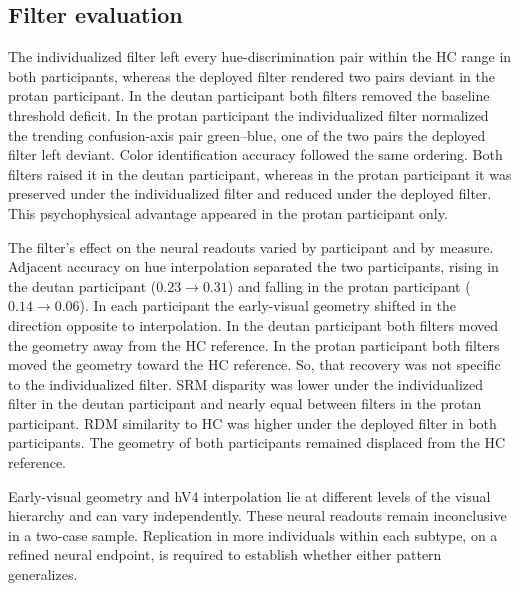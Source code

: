 \subsection{Filter evaluation}
The individualized filter left every hue-discrimination pair within the HC range in both participants, whereas the deployed filter rendered two pairs deviant in the protan participant. In the deutan participant both filters removed the baseline threshold deficit. In the protan participant the individualized filter normalized the trending confusion-axis pair green--blue, one of the two pairs the deployed filter left deviant. Color identification accuracy followed the same ordering. Both filters raised it in the deutan participant, whereas in the protan participant it was preserved under the individualized filter and reduced under the deployed filter. This psychophysical advantage appeared in the protan participant only.

The filter's effect on the neural readouts varied by participant and by measure. Adjacent accuracy on hue interpolation separated the two participants, rising in the deutan participant ($0.23 \to 0.31$) and falling in the protan participant ($0.14 \to 0.06$). In each participant the early-visual geometry shifted in the direction opposite to interpolation. In the deutan participant both filters moved the geometry away from the HC reference. In the protan participant both filters moved the geometry toward the HC reference. So, that recovery was not specific to the individualized filter. SRM disparity was lower under the individualized filter in the deutan participant and nearly equal between filters in the protan participant. RDM similarity to HC was higher under the deployed filter in both participants. The geometry of both participants remained displaced from the HC reference.

Early-visual geometry and hV4 interpolation lie at different levels of the visual hierarchy and can vary independently. These neural readouts remain inconclusive in a two-case sample. Replication in more individuals within each subtype, on a refined neural endpoint, is required to establish whether either pattern generalizes.


